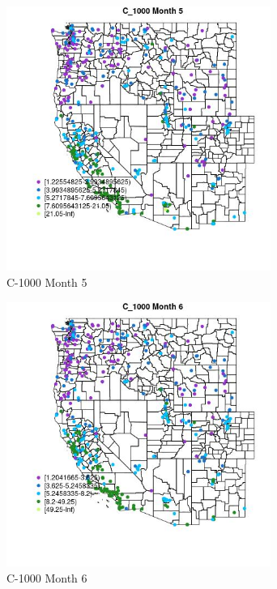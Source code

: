 \begin{figure} 
\centering  
\includegraphics[width=0.77\textwidth]{Code_Outputs/ML_input_report_ML_input_PM25_Step5_part_d_de_duplicated_aves_ML_input_MapObsMo5C_1000.jpg} 
\caption{\label{fig:ML_input_report_ML_input_PM25_Step5_part_d_de_duplicated_aves_ML_inputMapObsMo5C_1000}C-1000 Month 5} 
\end{figure} 
 

\begin{figure} 
\centering  
\includegraphics[width=0.77\textwidth]{Code_Outputs/ML_input_report_ML_input_PM25_Step5_part_d_de_duplicated_aves_ML_input_MapObsMo6C_1000.jpg} 
\caption{\label{fig:ML_input_report_ML_input_PM25_Step5_part_d_de_duplicated_aves_ML_inputMapObsMo6C_1000}C-1000 Month 6} 
\end{figure} 
 

